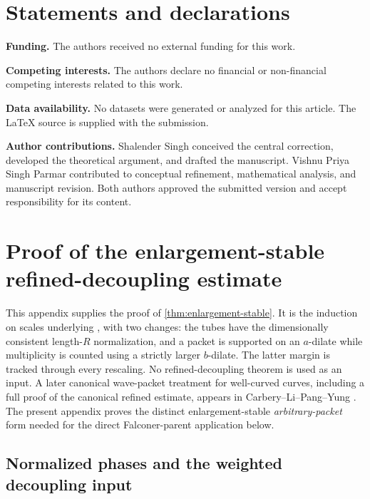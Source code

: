 \documentclass[11pt,letterpaper]{amsart}
\begin{document}
\section*{Statements and declarations}

\noindent\textbf{Funding.}
The authors received no external funding for this work.

\smallskip
\noindent\textbf{Competing interests.}
The authors declare no financial or non-financial competing interests
related to this work.

\smallskip
\noindent\textbf{Data availability.}
No datasets were generated or analyzed for this article.  The LaTeX source
is supplied with the submission.

\smallskip
\noindent\textbf{Author contributions.}
Shalender Singh conceived the central correction, developed the theoretical
argument, and drafted the manuscript.  Vishnu Priya Singh Parmar contributed
to conceptual refinement, mathematical analysis, and manuscript revision.
Both authors approved the submitted version and accept responsibility for
its content.
\appendix
\section{Proof of the enlargement-stable refined-decoupling estimate}
\label{app:refined-decoupling}

This appendix supplies the proof of \cref{thm:enlargement-stable}.  It is the
induction on scales underlying \cite[Theorem~4.2]{GIOW}, with two changes:
the tubes have the dimensionally consistent length-$R$ normalization, and a
packet is supported on an $a$-dilate while multiplicity is counted using a
strictly larger $b$-dilate.  The latter margin is tracked through every
rescaling.  No refined-decoupling theorem is used as an input.  A later canonical
wave-packet treatment for well-curved curves, including a full proof of the
canonical refined estimate, appears in Carbery--Li--Pang--Yung
\cite{CLPY}.  The present appendix proves the distinct enlargement-stable
\emph{arbitrary-packet} form needed for the direct Falconer-parent
application below.

\subsection{Normalized phases and the weighted decoupling input}
\label{app:normalized-family}
\end{document}
